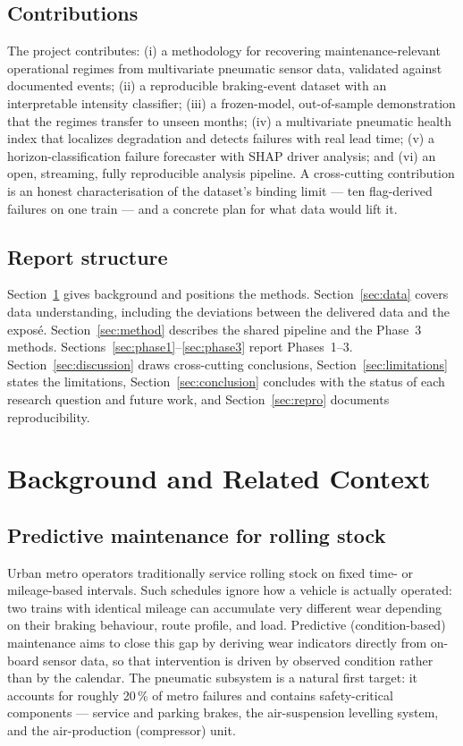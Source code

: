 \documentclass[11pt,a4paper]{article}
\begin{document}
\subsection{Contributions}
The project contributes: (i) a methodology for recovering maintenance-relevant operational
regimes from multivariate pneumatic sensor data, validated against documented events;
(ii) a reproducible braking-event dataset with an interpretable intensity classifier;
(iii) a frozen-model, out-of-sample demonstration that the regimes transfer to unseen
months; (iv) a multivariate pneumatic health index that localizes degradation and detects
failures with real lead time; (v) a horizon-classification failure forecaster with SHAP
driver analysis; and (vi) an open, streaming, fully reproducible analysis pipeline. A
cross-cutting contribution is an honest characterisation of the dataset's binding limit
--- ten flag-derived failures on one train --- and a concrete plan for what data would lift it.

\subsection{Report structure}
Section~\ref{sec:background} gives background and positions the methods. Section~\ref{sec:data}
covers data understanding, including the deviations between the delivered data and the
exposé. Section~\ref{sec:method} describes the shared pipeline and the Phase~3 methods.
Sections~\ref{sec:phase1}--\ref{sec:phase3} report Phases~1--3. Section~\ref{sec:discussion}
draws cross-cutting conclusions, Section~\ref{sec:limitations} states the limitations,
Section~\ref{sec:conclusion} concludes with the status of each research question and future
work, and Section~\ref{sec:repro} documents reproducibility.

\setcounter{section}{1}
\section{Background and Related Context}
\label{sec:background}

\subsection{Predictive maintenance for rolling stock}
Urban metro operators traditionally service rolling stock on fixed time- or
mileage-based intervals. Such schedules ignore how a vehicle is actually operated:
two trains with identical mileage can accumulate very different wear depending on their
braking behaviour, route profile, and load. Predictive (condition-based) maintenance
aims to close this gap by deriving wear indicators directly from on-board sensor data,
so that intervention is driven by observed condition rather than by the calendar. The
pneumatic subsystem is a natural first target: it accounts for roughly 20\,\% of metro
failures and contains safety-critical components --- service and parking brakes, the
air-suspension levelling system, and the air-production (compressor) unit.
\end{document}
